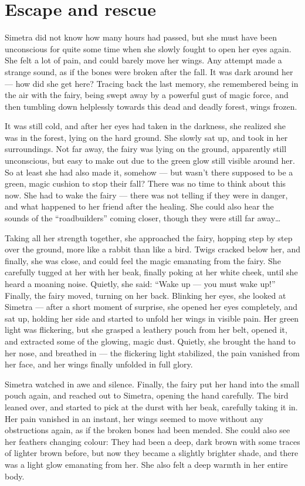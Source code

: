 \chapter{Escape and rescue}
\label{cha:escape-rescue}
Simetra did not know how many hours had passed, but she must have been unconscious for quite some time when she slowly fought to open her eyes again.
She felt a lot of pain, and could barely move her wings. Any attempt made a strange sound, as if the bones were broken after the fall. It was dark around her --- how did she get here? Tracing back the last memory, she remembered being in the air with the fairy, being swept away by a powerful gust of magic force, and then tumbling down helplessly towards this dead and deadly forest, wings frozen.

It was still cold, and after her eyes had taken in the darkness, she realized she was in the forest, lying on the hard ground. She slowly sat up, and took in her surroundings. Not far away, the fairy was lying on the ground, apparently still unconscious, but easy to make out due to the green glow still visible around her. So at least she had also made it, somehow --- but wasn't there supposed to be a green, magic cushion to stop their fall?
There was no time to think about this now. She had to wake the fairy --- there was not telling if they were in danger, and what happened to her friend after the healing. She could also hear the sounds of the \enquote{roadbuilders} coming closer, though they were still far away\dots

Taking all her strength together, she approached the fairy, hopping step by step over the ground, more like a rabbit than like a bird. Twigs cracked below her, and finally, she was close, and could feel the magic emanating from the fairy. She carefully tugged at her with her beak, finally poking at her white cheek, until she heard a moaning noise. Quietly, she said: \enquote{Wake up --- you must wake up!} Finally, the fairy moved, turning on her back. Blinking her eyes, she looked at Simetra --- after a short moment of surprise, she opened her eyes completely, and sat up, holding her side and started to unfold her wings in visible pain. Her green light was flickering, but she grasped a leathery pouch from her belt, opened it, and extracted some of the glowing, magic dust. Quietly, she brought the hand to her nose, and breathed in --- the flickering light stabilized, the pain vanished from her face, and her wings finally unfolded in full glory.

Simetra watched in awe and silence. Finally, the fairy put her hand into the small pouch again, and reached out to Simetra, opening the hand carefully. The bird leaned over, and started to pick at the durst with her beak, carefully taking it in. Her pain vanished in an instant, her wings seemed to move without any obstructions again, as if the broken bones had been mended. She could also see her feathers changing colour: They had been a deep, dark brown with some traces of lighter brown before, but now they became a slightly brighter shade, and there was a light glow emanating from her. She also felt a deep warmth in her entire body.

